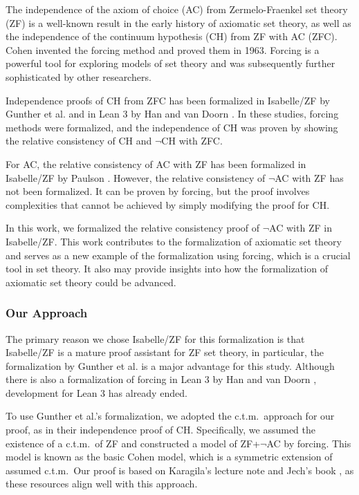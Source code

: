 \documentclass{report}
\begin{document}
The independence of the axiom of choice (AC) from Zermelo-Fraenkel set theory (ZF) is a well-known result in the early history of axiomatic set theory,
as well as the independence of the continuum hypothesis (CH) from ZF with AC (ZFC).
Cohen invented the forcing method and proved them in 1963.
Forcing is a powerful tool for exploring models of set theory and was subsequently further sophisticated by other researchers.

Independence proofs of CH from ZFC has been formalized in Isabelle/ZF by Gunther et al. \cite{gunther_independence} and in Lean 3 by Han and van Doorn \cite{flypitch}.
In these studies, forcing methods were formalized, and the independence of CH was proven by 
showing the relative consistency of CH and $\neg$CH with ZFC.

For AC, the relative consistency of AC with ZF has been formalized in Isabelle/ZF by Paulson \cite{paulson_AC_consistency}.
However, the relative consistency of $\neg$AC with ZF has not been formalized.
It can be proven by forcing, but the proof involves complexities that cannot be achieved by simply modifying the proof for CH.

In this work, we formalized the relative consistency proof of $\neg$AC with ZF in Isabelle/ZF. 
This work contributes to the formalization of axiomatic set theory and 
serves as a new example of the formalization using forcing, which is a crucial tool in set theory.
It also may provide insights into how the formalization of axiomatic set theory could be advanced.


\subsubsection{Our Approach}
The primary reason we chose Isabelle/ZF for this formalization is that Isabelle/ZF is a mature proof assistant for ZF set theory,
in particular, the formalization by Gunther et al. \cite{gunther_forcing} is a major advantage for this study.
Although there is also a formalization of forcing in Lean 3 by Han and van Doorn \cite{flypitch}, development for Lean 3 has already ended.

To use Gunther et al.'s formalization, we adopted the c.t.m.\  approach for our proof, as in their independence proof of CH.
Specifically, we assumed the existence of a c.t.m.\  of ZF and constructed a model of ZF+$\neg$AC by forcing.
This model is known as the basic Cohen model, which is a symmetric extension of assumed c.t.m.\ 
Our proof is based on Karagila's lecture note \cite{karagila} and Jech's book \cite{jech_set_theory,jech_AC},
as these resources align well with this approach.
\end{document}

